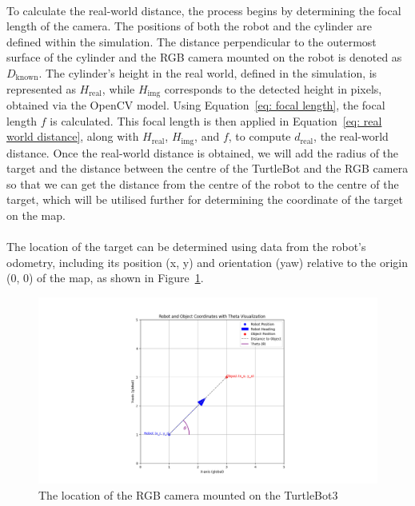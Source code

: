 \paragraph*{}
To calculate the real-world distance, the process begins by determining the focal length of the camera. The positions of both the robot and the cylinder are defined within the simulation. The distance perpendicular to the outermost surface of the cylinder and the RGB camera mounted on the robot is denoted as \(D_{\text{known}}\). The cylinder's height in the real world, defined in the simulation, is represented as \(H_{\text{real}}\), while \(H_{\text{img}}\) corresponds to the detected height in pixels, obtained via the OpenCV model. Using Equation~\ref{eq: focal length}, the focal length \(f\) is calculated. This focal length is then applied in Equation~\ref{eq: real world distance}, along with \(H_{\text{real}}\), \(H_{\text{img}}\), and \(f\), to compute \(d_{\text{real}}\), the real-world distance. Once the real-world distance is obtained, we will add the radius of the target and the distance between the centre of the TurtleBot and the RGB camera so that we can get the distance from the centre of the robot to the centre of the target, which will be utilised further for determining the coordinate of the target on the map.

\paragraph*{}
The location of the target can be determined using data from the robot’s odometry, including its position (x, y) and orientation (yaw) relative to the origin (0, 0) of the map, as shown in Figure~\ref{fig:coordinate visualization}.

\begin{figure}[H]
    \centering
    \includegraphics[width=1.1\linewidth]{assets/images/object_detection/fig3.png}
    \caption{The location of the RGB camera mounted on the TurtleBot3}
    \label{fig:coordinate visualization} 
\end{figure}

